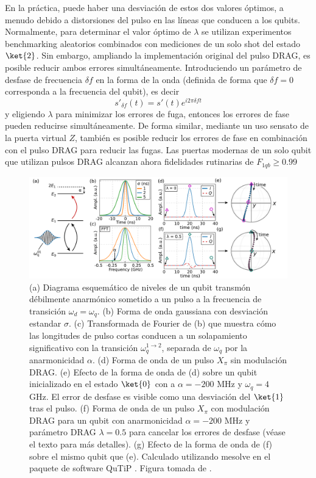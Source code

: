     En la práctica, puede haber una desviación de estos dos valores óptimos, a menudo debido a distorsiones del pulso en las líneas que conducen a los qubits. Normalmente, para determinar el valor óptimo de $\lambda$ se utilizan experimentos benchmarking aleatorios combinados con mediciones de un solo shot del estado $\ket{2}$. Sin embargo, ampliando la implementación original del pulso DRAG, es posible reducir ambos errores simultáneamente. Introduciendo un parámetro de desfase de frecuencia $\delta f$ en la forma de la onda (definida de forma que $\delta f = 0$ corresponda a la frecuencia del qubit), es decir
    \begin{equation}
        s'_{\delta f} (t) = s'(t) e^{i 2 \pi \delta f t}
    \end{equation}
    y eligiendo $\lambda$ para minimizar los errores de fuga, entonces los errores de fase pueden reducirse simultáneamente. De forma similar, mediante un uso sensato de la puerta virtual $Z$, también es posible reducir los errores de fase en combinación con el pulso DRAG para reducir las fugas. Las puertas modernas de un solo qubit que utilizan pulsos DRAG alcanzan ahora fidelidades rutinarias de $F_{1qb} \geq 0.99$
    
    
    \begin{figure}[t]
        \centering 
        \includegraphics[width=1\linewidth]{Figuras/Fig_scq_drag_scheme_3.png}
        \caption{(a) Diagrama esquemático de niveles de un qubit transmón débilmente anarmónico sometido a un pulso a la frecuencia de transición $\omega_d = \omega_q$. (b) Forma de onda gaussiana con desviación estandar $\sigma$. (c) Transformada de Fourier de (b) que muestra cómo las longitudes de pulso cortas conducen a un solapamiento significativo con la transición $\omega_q^{1 \rightarrow 2}$, separada de $\omega_q$ por la anarmonicidad $\alpha$. (d) Forma de onda de un pulso $X_\pi$ sin modulación DRAG. (e) Efecto de la forma de onda de (d) sobre un qubit inicializado en el estado $\ket{0}$ con a $\alpha = - 200$ MHz y $\omega_q =  4$ GHz. El error de desfase es visible como una desviación del $\ket{1}$ tras el pulso. (f) Forma de onda de un pulso $X_\pi$ con modulación DRAG para un qubit con anarmonicidad $\alpha = - 200$ MHz y parámetro DRAG $\lambda = 0.5$ para cancelar los errores de desfase (véase el texto para más detalles). (g) Efecto de la forma de onda de (f) sobre el mismo qubit que (e). Calculado utilizando mesolve en el paquete de software QuTiP \cite{bib_scq_JOHANSSON20131234}. Figura tomada de \cite{bib_A_quantum_engineers_guide}.}
        \label{Fig_scq_drag_scheme_3}
    \end{figure}


